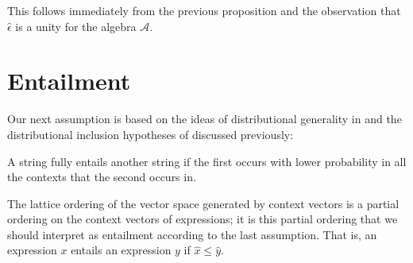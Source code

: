\documentclass[11pt]{report}
\begin{document}
This follows immediately from the previous proposition and the observation that $\hat{\epsilon}$ is a unity for the algebra $\mathcal{A}$.

\section{Entailment}


Our next assumption is based on the ideas of distributional generality in \citep{Weeds:04} and the distributional inclusion hypotheses of \cite{Geffet:05} discussed previously:
\begin{assumption} A string fully entails another string if the first occurs with lower probability in all the contexts that the second occurs in.
\end{assumption}\noindent
The lattice ordering of the vector space generated by context vectors is a partial ordering on the context vectors of expressions; it is this partial ordering that we should interpret as entailment according to the last assumption. That is, an expression $x$ entails an expression $y$ if $\hat{x} \le \hat{y}$.
\end{document}
